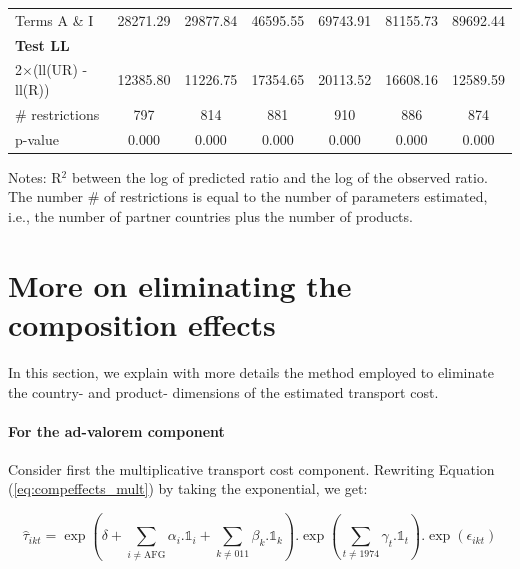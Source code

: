 \documentclass[a4paper,11pt]{article}
\begin{document}
\begin{table}[htbp]
\begin{center}
{\begin{tabular}{l|cccccc}
Terms A \& I & 28271.29 & 29877.84 & \multicolumn{1}{c}{46595.55} & \multicolumn{1}{c}{69743.91} & \multicolumn{1}{c}{81155.73} & \multicolumn{1}{c}{89692.44} \\
\textbf{Test LL} &       &       & & &  & \\
2$\times$(ll(UR) -ll(R)) & 12385.80 & 11226.75 & \multicolumn{1}{c}{17354.65} & \multicolumn{1}{c}{20113.52} & \multicolumn{1}{c}{16608.16} & \multicolumn{1}{c}{12589.59} \\
\# restrictions  & 797   & 814   & \multicolumn{1}{c}{881} & \multicolumn{1}{c}{910} & \multicolumn{1}{c}{886} & \multicolumn{1}{c}{874} \\
p-value & 0.000 & 0.000 & \multicolumn{1}{c}{0.000} & \multicolumn{1}{c}{0.000} & \multicolumn{1}{c}{0.000} & \multicolumn{1}{c}{0.000} \\
\hline\hline
\end{tabular}}
\end{center}
  \vspace{-10pt}\tiny{Notes: R$^{2}$ between the log of predicted ratio and the log of the observed ratio. The number \# of restrictions is equal to the number of parameters estimated, i.e., the number of partner countries plus the number of products.}
\end{table}%

\section{More on eliminating the composition effects \label{app:comp-effects}}

In this section, we explain with more details the method employed to eliminate the country- and product- dimensions of the estimated transport cost.

\paragraph{For the ad-valorem component} Consider first the multiplicative transport cost component. Rewriting Equation (\ref{eq:compeffects_mult}) by taking the exponential, we get:

\begin{equation*}
\widehat{\tau}_{ikt}=\exp\left(\delta + \sum_{i \neq \text{AFG}}\alpha_i.\mathbb{1}_i+\sum_{k\neq \text{011}}\beta_k.\mathbb{1}_k\right).\exp\left(\sum_{t \neq 1974}\gamma_t.\mathbb{1}_t\right) .\exp\left(\epsilon_{ikt}\right)
\end{equation*}
\end{document}
